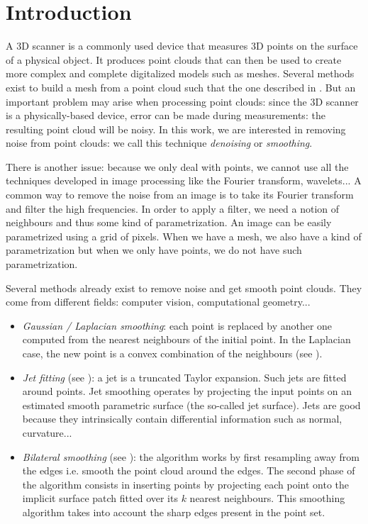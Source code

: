 \chapter{Introduction}

A 3D scanner is a commonly used device that measures 3D points on the surface of
a physical object.  It produces point clouds that can then be used to create
more complex and complete digitalized models such as meshes. Several methods
exist to build a mesh from a point cloud such that the one described in
\cite{alexa2003computing}. But an important problem may arise when processing
point clouds: since the 3D scanner is a physically-based device, error can be
made during measurements: the resulting point cloud will be noisy. In this work,
we are interested in removing noise from point clouds: we call this technique
\textit{denoising} or \textit{smoothing}.

There is another issue: because we only deal with points, we cannot use all the
techniques developed in image processing like the Fourier transform, wavelets...
A common way to remove the noise from an image is to take its Fourier transform
and filter the high frequencies. In order to apply a filter, we need a notion of
neighbours and thus some kind of parametrization. An image can be easily
parametrized using a grid of pixels. When we have a mesh, we also have a kind of
parametrization but when we only have points, we do not have such
parametrization.

Several methods already exist to remove noise and get smooth point clouds.
They come from different fields: computer vision, computational geometry...

\begin{itemize}
    \item \textit{Gaussian / Laplacian smoothing}: each point is replaced by
        another one computed from the nearest neighbours of the initial point. In
        the Laplacian case, the new point is a convex combination of the
        neighbours (see \cite{vollmer1999improved}).
    \item \textit{Jet fitting} (see \cite{cazals2005estimating}): a jet is a truncated
        Taylor expansion. Such jets are fitted around points. Jet smoothing
        operates by projecting the input points on an estimated smooth
        parametric surface (the so-called jet surface). Jets are good because
        they intrinsically contain differential information such as normal,
        curvature...
    \item \textit{Bilateral smoothing} (see \cite{huang2013edge}): the algorithm
        works by first resampling away from the edges i.e. smooth the point
        cloud around the edges. The second phase of the algorithm consists in
        inserting points by projecting each point onto the implicit surface
        patch fitted over its $ k $ nearest neighbours. This smoothing algorithm
        takes into account the sharp edges present in the point set.
\end{itemize}

